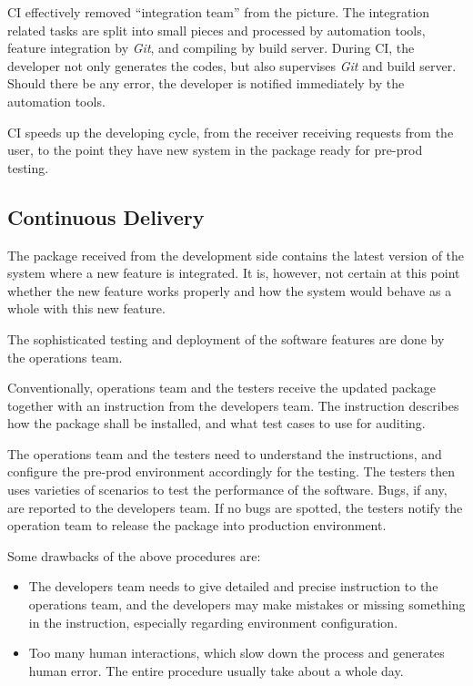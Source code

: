 CI effectively removed ``integration team'' from the picture. The integration related tasks are split into small pieces and processed by automation tools, feature integration by \textit{Git}, and compiling by build server. During CI, the developer not only generates the codes, but also supervises \textit{Git} and build server. Should there be any error, the developer is notified immediately by the automation tools.

CI speeds up the developing cycle, from the receiver receiving requests from the user, to the point they have new system in the package ready for pre-prod testing.

\subsection{Continuous Delivery}

The package received from the development side contains the latest version of the system where a new feature is integrated. It is, however, not certain at this point whether the new feature works properly and how the system would behave as a whole with this new feature.

The sophisticated testing and deployment of the software features are done by the operations team.

Conventionally, operations team and the testers receive the updated package together with an instruction from the developers team. The instruction describes how the package shall be installed, and what test cases to use for auditing.

The operations team and the testers need to understand the instructions, and configure the pre-prod environment accordingly for the testing. The testers then uses varieties of scenarios to test the performance of the software. Bugs, if any, are reported to the developers team. If no bugs are spotted, the testers notify the operation team to release the package into production environment.

Some drawbacks of the above procedures are:
\begin{itemize}
	\item The developers team needs to give detailed and precise instruction to the operations team, and the developers may make mistakes or missing something in the instruction, especially regarding environment configuration.
	\item Too many human interactions, which slow down the process and generates human error. The entire procedure usually take about a whole day.
\end{itemize}

